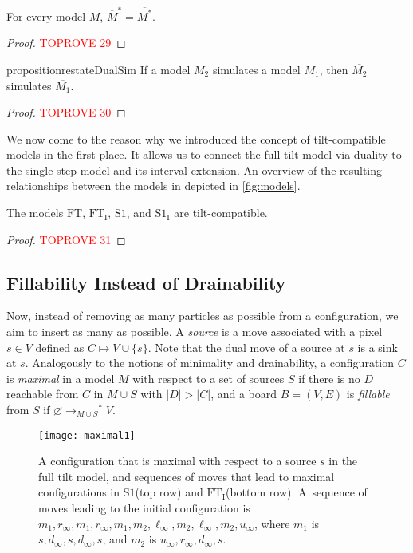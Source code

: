 \documentclass[a4paper,UKenglish,cleveref,thm-restate]{lipics-v2021}
\newcommand{\FT}{\ensuremath{\mathrm{FT}}\xspace}
\newcommand{\SSt}{\ensuremath{\mathrm{S1}}\xspace}
\newcommand{\IE}[1][\FT]{\ensuremath{{#1}_\mathrm{I}}\xspace}
\newcommand{\dual}[1]{\ensuremath{\overline{#1}}\xspace}
\newcommand{\rOne}[1][M]{\ensuremath{\rightarrow_{#1}}}
\newcommand{\rStar}[1][M]{\rOne[#1]^*}
\begin{document}
\begin{proposition}
    \label{dual_star_commutes}
    For every model $M$, \(\dual{M}^* = \dual{M^*}\).
\end{proposition}
\begin{proof}\textcolor{red}{TOPROVE 29}\end{proof}

\begin{restatable}{proposition}{restateDualSim}\label{dual_simulation}
If a model $M_2$ simulates a model $M_1$, then $\dual{M_2}$ simulates
$\dual{M_1}$.
\end{restatable}
\begin{proof}\textcolor{red}{TOPROVE 30}\end{proof}

We now come to the reason why we introduced the concept of tilt-compatible
models in the first place. It allows us to connect the full tilt model via
duality to the single step model and its interval extension. An overview of the
resulting relationships between the models in depicted in \cref{fig:models}.

\begin{proposition}\label{prop:concrete-duals-tc}
The models \dual{\FT}, \dual{\IE}, \dual{\SSt}, and \dual{\IE[\SSt]} are
tilt-compatible.
\end{proposition}
\begin{proof}\textcolor{red}{TOPROVE 31}\end{proof}

\subsection{Fillability Instead of Drainability}

Now, instead of removing as many particles as possible from a configuration, we
aim to insert as many as possible. A \emph{source} is a move associated with a
pixel $s \in V$ defined as \(C \mapsto V \cup \{s\}\). Note that the dual move
of a source at $s$ is a sink at $s$. Analogously to the notions of minimality
and drainability, a configuration $C$ is \emph{maximal} in a model $M$ with
respect to a set of sources $S$ if there is no $D$ reachable from $C$ in \(M
\cup S\) with \(|D| > |C|\), and a board $B=(V,E)$ is \emph{fillable} from $S$
if \(\varnothing \rStar[M \cup S] V\).

\begin{figure}[htb]
\centering
\texttt{[image: maximal1]}\caption{A configuration that is maximal with respect to a source $s$ in the
  full tilt model, and sequences of moves that lead to maximal configurations in
  \SSt (top row) and \IE (bottom row).
  A~sequence of moves leading to the initial configuration is
  \(m_1, r_\infty, m_1, r_\infty, m_1, m_2, \ell_\infty, m_2, \ell_\infty, m_2, u_\infty\),
  where $m_1$ is \(s, d_\infty, s, d_\infty, s\), and $m_2$ is
  \(u_\infty, r_\infty, d_\infty, s\).}\label{fig:maximal1}
\end{figure}
\end{document}
